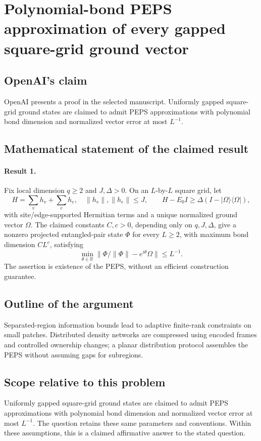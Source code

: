 \documentclass[11pt]{article}
\begin{document}
\section*{Polynomial-bond PEPS approximation of every gapped square-grid ground vector}

\subsection{OpenAI's claim}
OpenAI presents a proof in the selected manuscript. Uniformly gapped square-grid ground states are claimed to admit PEPS approximations with polynomial bond dimension and normalized vector error at most $L^{-1}$.

\subsection{Mathematical statement of the claimed result}
\paragraph{Result 1.} Fix local dimension \(q\ge2\) and \(J,\Delta>0\). On an \(L\)-by-\(L\) square grid, let
\[
 H=\sum_vh_v+\sum_eh_e,\quad\|h_v\|,\|h_e\|\le J,\qquad
 H-E_0I\ge\Delta(I-|\Omega\rangle\langle\Omega|),
\]
with site/edge-supported Hermitian terms and a unique normalized ground vector \(\Omega\). The claimed constants \(C,c>0\), depending only on \(q,J,\Delta\), give a nonzero projected entangled-pair state \(\Phi\) for every \(L\ge2\), with maximum bond dimension \(CL^c\), satisfying
\[
 \min_{\theta\in\mathbb R}\|\Phi/\|\Phi\|-e^{i\theta}\Omega\|\le L^{-1}.
\]
The assertion is existence of the PEPS, without an efficient construction guarantee.

\subsection{Outline of the argument}
Separated-region information bounds lead to adaptive finite-rank constraints on small patches. Distributed density networks are compressed using encoded frames and controlled ownership changes; a planar distribution protocol assembles the PEPS without assuming gaps for subregions.

\subsection{Scope relative to this problem}
Uniformly gapped square-grid ground states are claimed to admit PEPS approximations with polynomial bond dimension and normalized vector error at most $L^{-1}$. The question retains these same parameters and conventions. Within these assumptions, this is a claimed affirmative answer to the stated question.
\end{document}
